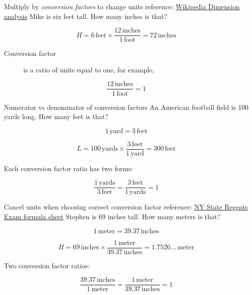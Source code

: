 \begin{frame}{Multiply by \emph{conversion factors} to change units}
  {reference: \href{https://en.wikipedia.org/wiki/Dimensional_analysis}{Wikipedia Dimension analysis}}
  Mike is six feet tall. How many inches is that? \par \medskip
  $$H = 6 \,\mathrm{feet} \times \displaystyle \frac{12 \,\mathrm{inches}}{1 \,\mathrm{foot}} = 72 \,\mathrm{inches}$$
  \begin{description}
    \item[Conversion factor] is a ratio of units equal to one, for example, 
  \end{description}
  $$\displaystyle \frac{12 \,\mathrm{inches}}{1 \,\mathrm{foot}} = 1$$
  \vspace{3cm}
\end{frame}

\begin{frame}{Numerator vs denominator of conversion factors}
  An American football field is 100 yards long. How many feet is that?  \par \smallskip
  $$1 \,\mathrm{yard} = 3 \,\mathrm{feet}$$ \par \medskip
   $$L = 100 \,\mathrm{yards} \times \displaystyle \frac{3 \,\mathrm{feet}}{1 \,\mathrm{yard}} = 300 \,\mathrm{feet}$$ \par \vspace{1cm}
  Each conversion factor ratio has two forms: \par \medskip
  $$\displaystyle  \frac{1 \,\mathrm{yards}}{3 \,\mathrm{feet}} = \frac{3 \,\mathrm{feet}}{1 \,\mathrm{yards}} = 1$$
\end{frame}

\begin{frame}{Cancel units when choosing correct conversion factor}
  {reference: \href{https://www.nysedregents.org/geometryre/622/geom62022-exam.pdf}{NY State Regents Exam formula sheet}}
  Stephen is 69 inches tall. How many meters is that? \par \smallskip
   $$1 \,\mathrm{meter} = 39.37 \,\mathrm{inches}$$ \par \medskip
    $$H = 69 \,\mathrm{inches} \times \displaystyle \frac{1 \,\mathrm{meter}}{39.37 \,\mathrm{inches}} = 1.7526\dots \,\mathrm{meter}$$ \par \vspace{1cm}
    Two conversion factor ratios: \par \medskip
      $$\displaystyle  \frac{39.37 \,\mathrm{inches}}{1 \,\mathrm{meter}} = \frac{1 \,\mathrm{meter}}{39.37 \,\mathrm{inches}} = 1$$
\end{frame}



